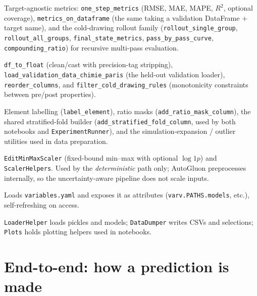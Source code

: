 \documentclass[11pt,a4paper]{article}
\newcommand{\code}[1]{\texttt{\small #1}}
\newcommand{\file}[1]{\texttt{\small #1}}
\begin{document}
\begin{description}[leftmargin=1.2em,style=nextline]
  \item[\code{Evaluation} (\file{src/modeling/}).]
    Target-agnostic metrics: \code{one\_step\_metrics} (RMSE, MAE, MAPE, $R^2$,
    optional coverage), \code{metrics\_on\_dataframe} (the same taking a
    validation DataFrame + target name), and the cold-drawing rollout family
    (\code{rollout\_single\_group}, \code{rollout\_all\_groups},
    \code{final\_state\_metrics}, \code{pass\_by\_pass\_curve},
    \code{compounding\_ratio}) for recursive multi-pass evaluation.
  \item[\code{Processing} (\file{src/processing/}).]
    \code{df\_to\_float} (clean/cast with precision-tag stripping),
    \code{load\_validation\_data\_chimie\_paris} (the held-out validation
    loader), \code{reorder\_columns}, and \code{filter\_cold\_drawing\_rules}
    (monotonicity constraints between pre/post properties).
  \item[\code{FeatureEngineering} (\file{src/feature\_engineering/}).]
    Element labelling (\code{label\_element}), ratio masks
    (\code{add\_ratio\_mask\_column}), the shared stratified-fold builder
    (\code{add\_stratified\_fold\_column}, used by both notebooks and
    \code{ExperimentRunner}), and the simulation-expansion / outlier utilities
    used in data preparation.
  \item[\code{Scaler} (\file{src/feature\_engineering/}).]
    \code{EditMinMaxScaler} (fixed-bound min--max with optional $\log1p$) and
    \code{ScalerHelpers}. Used by the \emph{deterministic} path only; AutoGluon
    preprocesses internally, so the uncertainty-aware pipeline does not scale
    inputs.
  \item[\code{Variables} (\file{config/}).]
    Loads \file{variables.yaml} and exposes it as attributes
    (\code{varv.PATHS.models}, etc.), self-refreshing on access.
  \item[\code{DataLoader} / \code{DataDumper} / \code{Plots}.]
    \code{LoaderHelper} loads pickles and models; \code{DataDumper} writes CSVs
    and selections; \code{Plots} holds plotting helpers used in notebooks.
\end{description}

\section{End-to-end: how a prediction is made}
\end{document}
